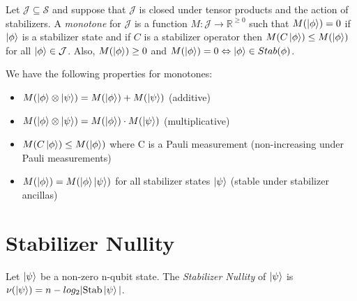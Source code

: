 \documentclass[12pt]{dalthesis}
\begin{document}

\begin{definition}
Let $\mathcal{J} \subseteq \mathcal{S}$ and suppose that $\mathcal{J}$ is closed under tensor products and the action of stabilizers. A \emph{monotone} for $\mathcal{J}$ is a function $M: \mathcal{J} \rightarrow \mathbb{R}^{\geq 0}$ such that $M(\ket{\phi}) = 0$ if $\ket{\phi}$ is a stabilizer state and if $C$ is a stabilizer operator then $M(C\ket{\phi}) \leq M(\ket{\phi})$ for all $\ket{\phi} \in \mathcal{J}$. Also, $M(\ket{\phi}) \geq 0$ and $M(\ket{\phi}) = 0 \Leftrightarrow \ket{\phi} \in Stab(\phi)$.
\end{definition}

\begin{definition} 
We have the following properties for monotones:
\begin{itemize}
\item $M(\ket{\phi} \otimes \ket{\psi}) = M(\ket{\phi}) + M(\ket{\psi})$ (additive) 
\item $M(\ket{\phi} \otimes \ket{\psi}) = M(\ket{\phi}) \cdot M(\ket{\psi})$ (multiplicative)
\item $M(C\ket{\phi}) \leq M(\ket{\phi})$ where C is a Pauli measurement (non-increasing under Pauli measurements)
\item $M(\ket{\phi}) = M(\ket{\phi}\ket{\psi})$ for all stabilizer states $\ket{\psi}$ (stable under stabilizer ancillas)
\end{itemize}
\end{definition}



%

\section{Stabilizer Nullity}


\begin{definition}
Let $\ket{\psi}$ be a non-zero n-qubit state. The \emph{Stabilizer Nullity} of $\ket{\psi}$ is $\nu(\ket{\psi}) = n - log_2 |\text{Stab}\ket{\psi}|$.
\end{definition}
\end{document}
